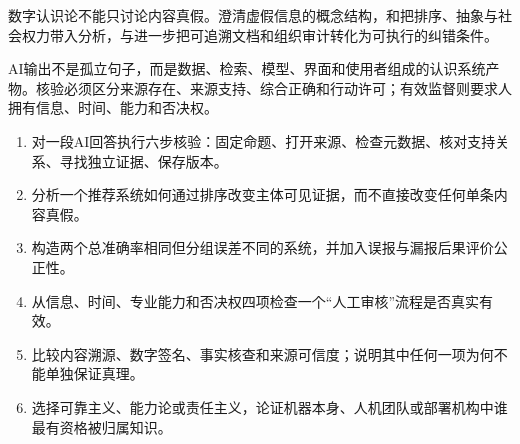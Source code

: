 数字认识论不能只讨论内容真假。\textcite{fallis2015}澄清虚假信息的概念结构，\textcite{noble2018}和\textcite{selbst2019}把排序、抽象与社会权力带入分析，\textcite{gebru2021}与\textcite{raji2020}进一步把可追溯文档和组织审计转化为可执行的纠错条件。

\begin{checkpoint}
AI输出不是孤立句子，而是数据、检索、模型、界面和使用者组成的认识系统产物。核验必须区分来源存在、来源支持、综合正确和行动许可；有效监督则要求人拥有信息、时间、能力和否决权。
\end{checkpoint}

\begin{exercises}
\begin{enumerate}
  \item 对一段AI回答执行六步核验：固定命题、打开来源、检查元数据、核对支持关系、寻找独立证据、保存版本。
  \item 分析一个推荐系统如何通过排序改变主体可见证据，而不直接改变任何单条内容真假。
  \item 构造两个总准确率相同但分组误差不同的系统，并加入误报与漏报后果评价公正性。
  \item 从信息、时间、专业能力和否决权四项检查一个“人工审核”流程是否真实有效。
  \item 比较内容溯源、数字签名、事实核查和来源可信度；说明其中任何一项为何不能单独保证真理。
  \item 选择可靠主义、能力论或责任主义，论证机器本身、人机团队或部署机构中谁最有资格被归属知识。
\end{enumerate}
\end{exercises}

\clearpage
\begin{readingmap}
\end{readingmap}
